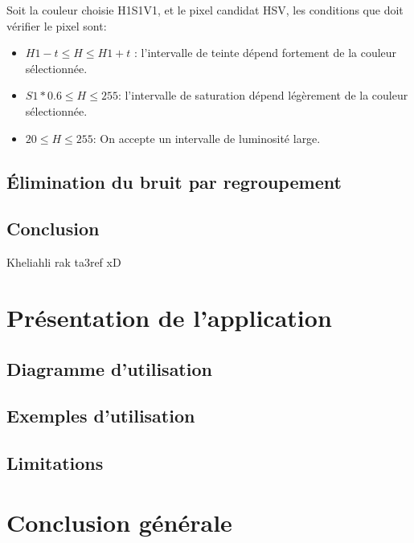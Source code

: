 \documentclass[12pt]{report}
\begin{document}
Soit la couleur choisie H1S1V1, et le pixel candidat HSV, les conditions que doit vérifier le pixel sont:
\begin{itemize}
	\item $H1-t \leq H \leq H1+t$ : l’intervalle de teinte dépend fortement de la couleur sélectionnée.
	
	\item $S1*0.6 \leq H \leq 255$: l’intervalle de saturation dépend légèrement de la couleur sélectionnée.
	
	\item $20 \leq H \leq 255$: On accepte un intervalle de luminosité large.
\end{itemize}

\section{Élimination du bruit par regroupement}

\section{Conclusion}
Kheliahli rak ta3ref xD 


\chapter{Présentation de l'application}

\section{Diagramme d'utilisation}
\section{Exemples d'utilisation}
\section{Limitations}

\chapter{Conclusion générale}
\paragraph{}
\end{document}

